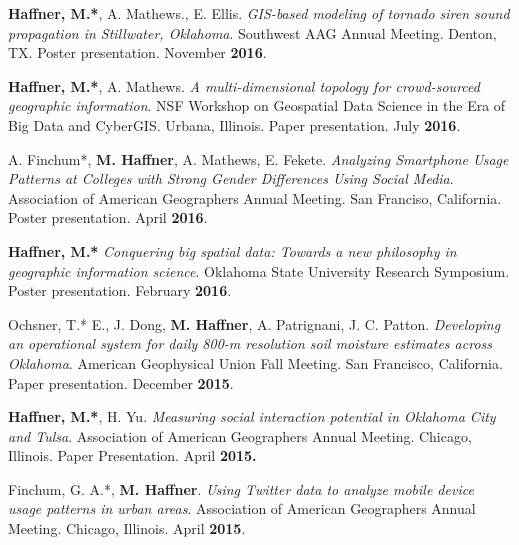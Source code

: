\begin{cventries}
   \cventry
      {}
      {}
      {}
      {}
      {
        \begin{cvitems}
            \item {\textbf{Haffner, M.*}, A. Mathews., E. Ellis.
                \textit{GIS-based modeling of tornado siren sound propagation in
                  Stillwater, Oklahoma}. Southwest AAG Annual Meeting. Denton,
                TX. Poster  presentation. November \textbf{2016}.} \\
            \item {\textbf{Haffner, M.*}, A. Mathews. \textit{A multi-dimensional topology for crowd-sourced geographic information}. NSF Workshop on Geospatial Data Science in the Era of Big Data and CyberGIS. Urbana, Illinois. Paper presentation. July \textbf{2016}.} \\
            \item A. Finchum*, {\textbf{M. Haffner}, A. Mathews, E. Fekete. \textit{Analyzing Smartphone Usage Patterns at Colleges with Strong Gender Differences Using Social Media}. Association of American Geographers Annual Meeting. San Franciso, California. Poster presentation. April \textbf{2016}.} \\
            \item {\textbf{Haffner, M.*} \textit{Conquering big spatial data: Towards a new philosophy in geographic information science}. Oklahoma State University Research Symposium. Poster presentation. February \textbf{2016}.} \\  
            \item {Ochsner, T.* E., J. Dong, \textbf{M. Haffner}, A. Patrignani, J. C. Patton. \textit{Developing an operational system for daily 800-m resolution soil moisture estimates across Oklahoma}. American Geophysical Union Fall Meeting. San Francisco, California. Paper presentation. December \textbf{2015}.} \\
            \item {\textbf{Haffner, M.*}, H. Yu. \textit{Measuring social interaction potential in Oklahoma City and Tulsa}. Association of American Geographers Annual Meeting. Chicago, Illinois. Paper Presentation. April \textbf{2015.}} \\
            \item {Finchum, G. A.*, \textbf{M. Haffner}. \textit{Using Twitter data to analyze mobile device usage patterns in urban areas}. Association of American Geographers Annual Meeting. Chicago, Illinois. April \textbf{2015}.}\\  

\end{cvitems}}
\end{cventries}
